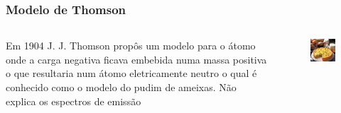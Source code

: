 \documentclass[12pt,brazil]{beamer}
\begin{document}
\begin{frame}
  \frametitle{Modelo de Thomson}
    \begin{columns}[c]

      \column{6cm}
        \fontsize{9pt}{11pt}\selectfont
      
        Em 1904 J. J. Thomson propôs um modelo para o átomo onde a carga negativa ficava embebida numa massa positiva o que resultaria num átomo eletricamente neutro o qual é conhecido como o modelo do pudim de ameixas.\newline\newline
        \color{red} Não explica os espectros de emissão
      
      \column{4cm}
        \vspace*{-0.75cm}
        \begin{figure}
          \includegraphics[width=4cm]{figuras/fig04}
        \end{figure}
      
    \end{columns}
\end{frame}


\end{document}
